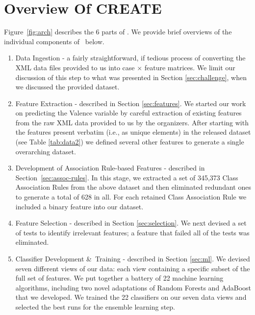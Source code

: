 \chapter{Overview Of CREATE}\label{sec:overview}
Figure~\ref{fig:arch} describes the 6 parts of \CREATE.
We provide brief overviews of the individual components of \CREATE\  below.


\begin{enumerate}
\item \textsf{Data Ingestion} - a fairly straightforward, if tedious process
of converting the XML data files provided to us into case $\times$ feature matrices.
We limit our discussion of this step to what was presented in 
Section \ref{sec:challenge}, when we discussed the provided dataset.

 \item \textsf{Feature Extraction} - described in Section \ref{sec:features}.  We started our work on predicting the \textsf{Valence} variable by careful
extraction of existing features from the raw XML data provided to us by the  organizers.
After starting with the features present verbatim (i.e.,
as unique elements) in the released dataset (see Table \ref{tab:data2}) we defined several other features to generate
a single overarching dataset.

 \item \textsf{Development of Association Rule-based Features} - described in Section~\ref{sec:assoc-rules}. In this stage, we extracted a set of 345,373 Class Association Rules from the above dataset and then eliminated redundant ones to generate a total of 628 in all. For
 each retained Class Association Rule we included a binary feature into our dataset.
 
 \item \textsf{Feature Selection} - described in Section \ref{sec:selection}. We next devised a set of tests to identify irrelevant features; a feature that failed all of the tests was eliminated.
 
 \item \textsf{Classifier Development \&\ Training} - described in Section \ref{sec:ml}. 
We devised seven different views of our data: each view containing a specific subset of the
full set of features. We put together a battery of 22 machine learning algorithms,
including two novel adaptations of Random Forests and AdaBoost that we developed.
We trained the 22 classifiers on our seven data views and selected the best runs
for the ensemble learning step.


\end{enumerate}
